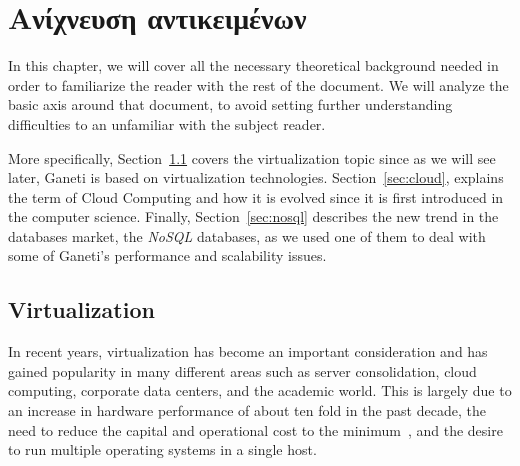 \chapter{Ανίχνευση αντικειμένων}\label{ch:objdetection}

In this chapter, we will cover all the necessary theoretical background needed
in order to familiarize the reader with the rest of the document. We will
analyze the basic axis around that document, to avoid setting further
understanding difficulties to an unfamiliar with the subject reader.

More specifically, Section~\ref{sec:virt} covers the virtualization topic
since as we will see later, Ganeti is based on virtualization technologies.
Section~\ref{sec:cloud}, explains the term of Cloud Computing and how it is
evolved since it is first introduced in the computer science. Finally,
Section~\ref{sec:nosql} describes the new trend in the databases market,
the \emph{NoSQL} databases, as we used one of them to deal with some of Ganeti's
performance and scalability issues.

\section{Virtualization}\label{sec:virt}

In recent years, virtualization has become an important consideration and has
gained popularity in many different areas such as server consolidation, cloud
computing, corporate data centers, and the academic world. This is largely due
to an increase in hardware performance of about ten fold in the past decade, the
need to reduce the capital and operational cost to the minimum~\cite{Graziano},
and the desire to run multiple operating systems in a single host.

